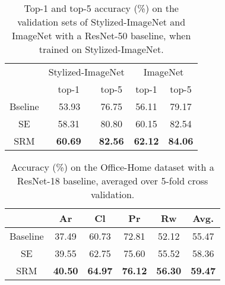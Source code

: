 \begin{table}
\caption{Top-1 and top-5 accuracy (\%) on the validation sets of Stylized-ImageNet and ImageNet with a ResNet-50 baseline, when trained on Stylized-ImageNet.}
\vspace{-1em}
\begin{center}
\begin{tabular}{c|c|c|c|c}
\hline
 & \multicolumn{2}{|c|}{Stylized-ImageNet} & \multicolumn{2}{|c}{ImageNet} \\ \cline{2-5}
 & top-1 & top-5 & top-1 & top-5 \\
\hline
Bseline &\ \  53.93 \  & 76.75 & 56.11 & 79.17\\
SE & 58.31 & 80.80 & 60.15 & 82.54 \\
SRM & \textbf{60.69} & \textbf{82.56} & \textbf{62.12} & \textbf{84.06} \\
\hline
\end{tabular}
\end{center}
\label{table:stylized-imagenet}
\end{table}

\begin{table}
\caption{Accuracy (\%) on the Office-Home dataset with a ResNet-18 baseline, averaged over 5-fold cross validation.}
\vspace{-1em}
\begin{center}
\begin{tabular}{c|c|c|c|c|c}
\hline
  & Ar & Cl & Pr & Rw & Avg. \\
\hline
Baseline & 37.49 & 60.73 & 72.81 & 52.12 & 55.47 \\ 
SE & 39.55 & 62.75 & 75.60 & 55.52 & 58.36  \\ 
SRM & \textbf{40.50} & \textbf{64.97} & \textbf{76.12} & \textbf{56.30} & \textbf{59.47}  \\ 
\hline
\end{tabular}
\end{center}
\label{table:officehome}
\end{table}


